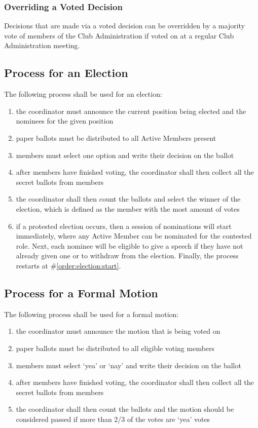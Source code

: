 \documentclass[english,11pt]{article}
\begin{document}
\subsubsection{Overriding a Voted Decision} \label{subsect:decision:voted:override}
Decisions that are made via a voted decision can be overridden by a majority vote of members of the Club Administration if voted on at a regular Club Administration meeting.

\subsection{Process for an Election} \label{sect:decision:election}
The following process shall be used for an election:

\begin{enumerate}
    \item \label{order:election:start} the coordinator must announce the current position being elected and the nominees for the given position
    \item paper ballots must be distributed to all Active Members present
    \item members must select one option and write their decision on the ballot
    \item after members have finished voting, the coordinator shall then collect all the secret ballots from members
    \item the coordinator shall then count the ballots and select the winner of the election, which is defined as the member with the most amount of votes
    \item \label{order:election:protested} if a protested election occurs, then a session of nominations will start immediately, where any Active Member can be nominated for the contested role.
        Next, each nominee will be eligible to give a speech if they have not already given one or to withdraw from the election.
        Finally, the process restarts at \#\ref{order:election:start}.
\end{enumerate}

\subsection{Process for a Formal Motion} \label{sect:decision:formal-motion}
The following process shall be used for a formal motion:

\begin{enumerate}
    \item the coordinator must announce the motion that is being voted on
    \item paper ballots must be distributed to all eligible voting members
    \item members must select `yea' or `nay' and write their decision on the ballot
    \item after members have finished voting, the coordinator shall then collect all the secret ballots from members
    \item the coordinator shall then count the ballots and the motion should be considered passed if more than 2/3 of the votes are `yea' votes
\end{enumerate}
\end{document}
